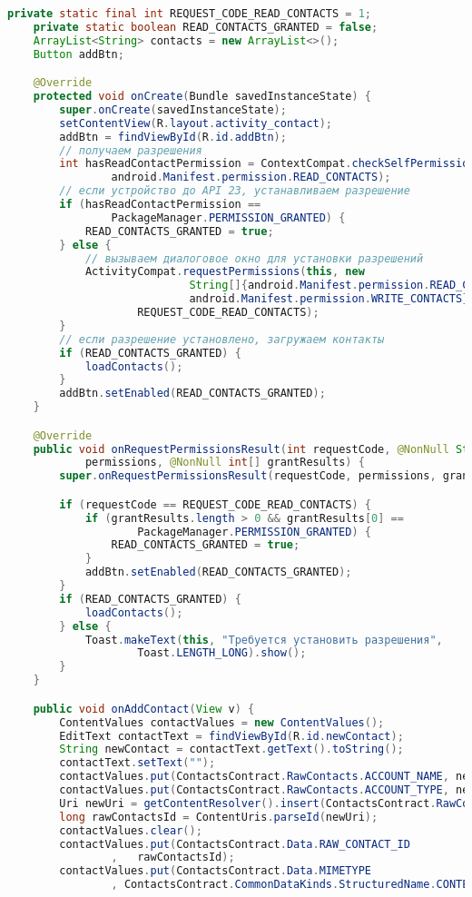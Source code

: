 \begin{lstlisting}[language=Java
	, label=lst:
	]
	private static final int REQUEST_CODE_READ_CONTACTS = 1;
	private static boolean READ_CONTACTS_GRANTED = false;
	ArrayList<String> contacts = new ArrayList<>();
	Button addBtn;

	@Override
	protected void onCreate(Bundle savedInstanceState) {
		super.onCreate(savedInstanceState);
		setContentView(R.layout.activity_contact);
		addBtn = findViewById(R.id.addBtn);
		// получаем разрешения
		int hasReadContactPermission = ContextCompat.checkSelfPermission(this,
				android.Manifest.permission.READ_CONTACTS);
		// если устройство до API 23, устанавливаем разрешение
		if (hasReadContactPermission ==
				PackageManager.PERMISSION_GRANTED) {
			READ_CONTACTS_GRANTED = true;
		} else {
			// вызываем диалоговое окно для установки разрешений
			ActivityCompat.requestPermissions(this, new
							String[]{android.Manifest.permission.READ_CONTACTS,
							android.Manifest.permission.WRITE_CONTACTS},
					REQUEST_CODE_READ_CONTACTS);
		}
		// если разрешение установлено, загружаем контакты
		if (READ_CONTACTS_GRANTED) {
			loadContacts();
		}
		addBtn.setEnabled(READ_CONTACTS_GRANTED);
	}

	@Override
	public void onRequestPermissionsResult(int requestCode, @NonNull String[]
			permissions, @NonNull int[] grantResults) {
		super.onRequestPermissionsResult(requestCode, permissions, grantResults);

		if (requestCode == REQUEST_CODE_READ_CONTACTS) {
			if (grantResults.length > 0 && grantResults[0] ==
					PackageManager.PERMISSION_GRANTED) {
				READ_CONTACTS_GRANTED = true;
			}
			addBtn.setEnabled(READ_CONTACTS_GRANTED);
		}
		if (READ_CONTACTS_GRANTED) {
			loadContacts();
		} else {
			Toast.makeText(this, "Требуется установить разрешения",
					Toast.LENGTH_LONG).show();
		}
	}

	public void onAddContact(View v) {
		ContentValues contactValues = new ContentValues();
		EditText contactText = findViewById(R.id.newContact);
		String newContact = contactText.getText().toString();
		contactText.setText("");
		contactValues.put(ContactsContract.RawContacts.ACCOUNT_NAME, newContact);
		contactValues.put(ContactsContract.RawContacts.ACCOUNT_TYPE, newContact);
		Uri newUri = getContentResolver().insert(ContactsContract.RawContacts.CONTENT_URI, contactValues);
		long rawContactsId = ContentUris.parseId(newUri);
		contactValues.clear();
		contactValues.put(ContactsContract.Data.RAW_CONTACT_ID
				,	rawContactsId);
		contactValues.put(ContactsContract.Data.MIMETYPE
				, ContactsContract.CommonDataKinds.StructuredName.CONTENT_ITEM_TYPE);


\end{lstlisting}
